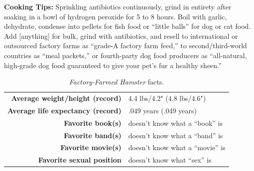 \documentclass[10pt,twoside,openright]{memoir}
\begin{document}
\vspace{2em}
\noindent
\textbf{Cooking Tips:} Sprinkling antibiotics continuously, grind in entirety
after soaking in a bowl of hydrogen peroxide for 5 to 8 hours. Boil with garlic,
dehydrate, condense into pellets for fish food or ``little balls'' for dog or
cat food. Add [anything] for bulk, grind with antibiotics, and resell to
international or outsourced factory farms as ``grade-A factory farm feed,'' to
second/third-world countries as ``meal packets,'' or fourth-party dog food
producers as ``all-natural, high-grade dog food guaranteed to give your
pet's fur a healthy sheen.''

\begin{table}
\begin{center}
  \small
  \begin{tabular}{rl}
  \textbf{Average weight/height (record)} & 4.4 lbs/4.2" (4.8 lbs/4.6") \\
  \textbf{Average life expectancy (record)} & .049 years (.049 years) \\
  \textbf{Favorite book(s)} & doesn't know what a ``book'' is \\
  \textbf{Favorite band(s)} & doesn't know what a ``band'' is \\
  \textbf{Favorite movie(s)} & doesn't know what a ``movie'' is \\
  \textbf{Favorite sexual position} & doesn't know what ``sex'' is \\
  \end{tabular}
\end{center}
\caption*{{\em Factory-Farmed Hamster} facts.}
\end{table}
\end{document}
